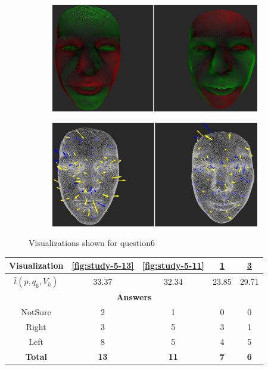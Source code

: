 \begin{figure}[h]
\begin{subfigure}{0.4\textwidth}
\includegraphics[width=\textwidth]{./screenshots/pair12.PNG}
\caption{}
\label{fig:study-5-12}
\end{subfigure}
\quad
\begin{subfigure}{0.4\textwidth}
\includegraphics[width=\textwidth]{./screenshots/pair14.PNG}
\caption{}
\label{fig:study-5-14}
\end{subfigure}
\caption{Visualizations shown for question6}
\end{figure}
\medskip

\begin{center}
\begin{tabular}{| c | c | c | c | c |}
	\hline
	Visualization & \ref{fig:study-5-13} & \ref{fig:study-5-11} & \ref{fig:study-5-12} & \ref{fig:study-5-14}\\ \hline
	\(\widehat{t}(p, q_6, V_k)\) & 33.37 & 32.34 & 23.85 & 29.71\\ \hline
	\multicolumn{5}{|c|}{\bf Answers} \\ \hline
	NotSure & 2 & 1 & 0 & 0\\ \hline
	Right & 3 & 5 & 3 & 1\\ \hline
	Left & 8 & 5 & 4 & 5\\ \hline
	{\bf Total} & {\bf 13} & {\bf 11} & {\bf 7} & {\bf 6}\\ \hline
\end{tabular}
\end{center}
\clearpage

